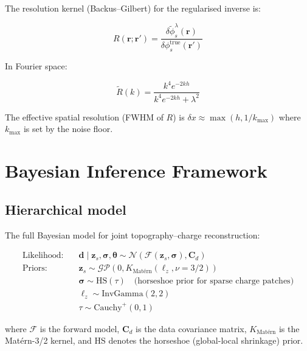 \documentclass[11pt,a4paper]{article}
\begin{document}
The resolution kernel (Backus–Gilbert) for the regularised inverse is:

\begin{equation}
R(\mathbf{r}; \mathbf{r}') = \frac{\delta\tilde{\phi}_s^{\lambda}(\mathbf{r})}
    {\delta\phi_s^{\text{true}}(\mathbf{r}')}
\label{eq:resolution_kernel}
\end{equation}

In Fourier space:

\begin{equation}
\tilde{R}(k) = \frac{k^4 e^{-2kh}}{k^4 e^{-2kh} + \lambda^2}
\label{eq:resolution_fourier}
\end{equation}

The effective spatial resolution (FWHM of $R$) is $\delta x \approx \max(h, 1/k_{\text{max}})$
where $k_{\text{max}}$ is set by the noise floor.

\section{Bayesian Inference Framework}

\subsection{Hierarchical model}

The full Bayesian model for joint topography–charge reconstruction:

\begin{align}
\text{Likelihood:}&\quad
    \mathbf{d} \mid \mathbf{z}_s, \boldsymbol{\sigma}, \boldsymbol{\theta}
    \sim \mathcal{N}(\mathcal{F}(\mathbf{z}_s, \boldsymbol{\sigma}), \mathbf{C}_d) \\
\text{Priors:}&\quad
    \mathbf{z}_s \sim \mathcal{GP}(0, K_{\text{Matérn}}(\ell_z, \nu=3/2)) \\
    &\quad \boldsymbol{\sigma} \sim \text{HS}(\tau) \quad
        \text{(horseshoe prior for sparse charge patches)} \\
    &\quad \ell_z \sim \text{InvGamma}(2, 2) \\
    &\quad \tau \sim \text{Cauchy}^+(0, 1)
\label{eq:bayesian_model}
\end{align}

where $\mathcal{F}$ is the forward model, $\mathbf{C}_d$ is the data covariance
matrix, $K_{\text{Matérn}}$ is the Matérn-3/2 kernel, and HS denotes the
horseshoe (global-local shrinkage) prior.
\end{document}
